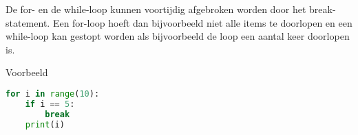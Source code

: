 De for- en de while-loop kunnen voortijdig afgebroken worden door het break-statement. Een for-loop hoeft dan bijvoorbeeld niet alle items te doorlopen en een while-loop kan gestopt worden als bijvoorbeeld de loop een aantal keer doorlopen is.

Voorbeeld
\begin{lstlisting}[language=python]
for i in range(10):
    if i == 5:
        break
    print(i)
\end{lstlisting}
